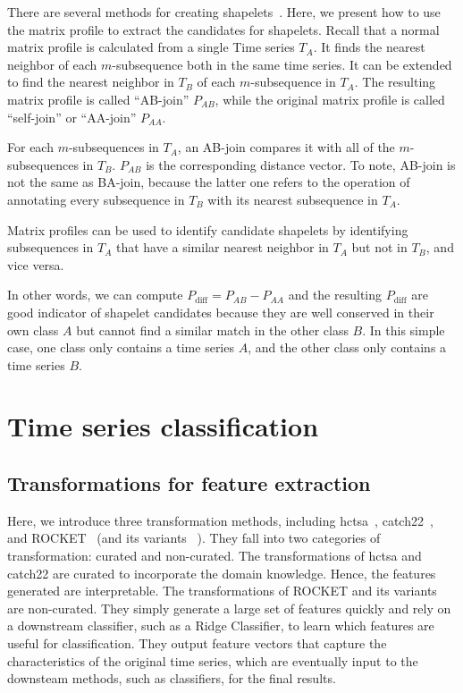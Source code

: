 There are several methods for creating shapelets~\cite{ye2009time, grabocka2014learning}.
Here, we present how to use the matrix profile to extract the candidates for shapelets.
Recall that a normal matrix profile is calculated from a single Time series $T_A$. It finds the nearest neighbor of each $m$-subsequence both in the same time series.
It can be extended to find the nearest neighbor in $T_B$ of each $m$-subsequence in $T_A$.
The resulting matrix profile is called ``AB-join'' $P_{AB}$, while the original matrix profile is called ``self-join'' or ``AA-join'' $P_{AA}$.

For each $m$-subsequences in $T_A$, an AB-join compares it with all of the $m$-subsequences in $T_B$.
$P_{AB}$ is the corresponding distance vector.
To note, AB-join is not the same as BA-join, because the latter one refers to the operation of annotating every subsequence in $T_B$ with its nearest subsequence in $T_A$.

Matrix profiles can be used to identify candidate shapelets by identifying subsequences in $T_A$ that have a similar nearest neighbor in $T_A$ but not in $T_B$, and vice versa.

In other words, we can compute $P_{\text{diff}} = P_{AB} - P_{AA}$ and the resulting $P_{\text{diff}}$ are good indicator of shapelet candidates because they are well conserved in their own class $A$ but cannot find a similar match in the other class $B$.
In this simple case, one class only contains a time series $A$, and the other class only contains a time series $B$.


\section{Time series classification} \label{sec:tsc} %

\subsection{Transformations for feature extraction} %

Here, we introduce three transformation methods, including hctsa~\cite{fulcher2017hctsa}, catch22~\cite{lubba2019catch22}, and ROCKET~\cite{dempster2020rocket} (and its variants ~\cite{dempster2021minirocket, tan2022multirocket, dempster2023hydra}).
They fall into two categories of transformation: curated and non-curated.
The transformations of hctsa and catch22 are curated to incorporate the domain knowledge. Hence, the features generated are interpretable.
The transformations of ROCKET and its variants are non-curated.
They simply generate a large set of features quickly and rely on a downstream classifier, such as a Ridge Classifier, to learn which features are useful for classification.
They output feature vectors that capture the characteristics of the original time series, which are eventually input to the downsteam methods, such as classifiers, for the final results.

